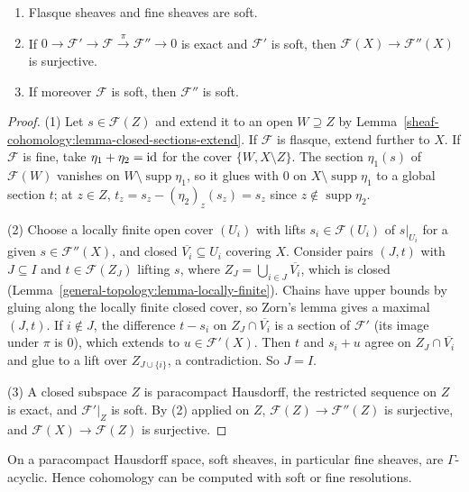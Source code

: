 \begin{lemma}\label{sheaf-cohomology:lemma-soft-properties}
\begin{enumerate}
\item Flasque sheaves and fine sheaves are soft.
\item If $0 \to \mathcal{F}' \to \mathcal{F} \xrightarrow{\pi} \mathcal{F}'' \to 0$ is exact and $\mathcal{F}'$ is soft, then $\mathcal{F}(X) \to \mathcal{F}''(X)$ is surjective.
\item If moreover $\mathcal{F}$ is soft, then $\mathcal{F}''$ is soft.
\end{enumerate}
\end{lemma}

\begin{proof}
(1) Let $s \in \mathcal{F}(Z)$ and extend it to an open $W \supseteq Z$ by Lemma~\ref{sheaf-cohomology:lemma-closed-sections-extend}. If $\mathcal{F}$ is flasque, extend further to $X$. If
$\mathcal{F}$ is fine, take $\eta_1 + \eta_2 = \mathrm{id}$ for the cover $\{W, X \setminus Z\}$. The section $\eta_1(s)$ of $\mathcal{F}(W)$ vanishes on $W \setminus \operatorname{supp}\eta_1$, so it glues
with $0$ on $X \setminus \operatorname{supp}\eta_1$ to a global section $t$; at $z \in Z$, $t_z = s_z - (\eta_2)_z(s_z) = s_z$ since $z \notin \operatorname{supp}\eta_2$.

(2) Choose a locally finite open cover $(U_i)$ with lifts $s_i \in \mathcal{F}(U_i)$ of $s|_{U_i}$ for a given $s \in \mathcal{F}''(X)$, and closed $\overline{V_i} \subseteq U_i$ covering $X$. Consider pairs
$(J, t)$ with $J \subseteq I$ and $t \in \mathcal{F}(Z_J)$ lifting $s$, where $Z_J = \bigcup_{i \in J}\overline{V_i}$, which is closed (Lemma~\ref{general-topology:lemma-locally-finite}). Chains
have upper bounds by gluing along the locally finite closed cover, so Zorn's lemma gives a maximal $(J, t)$. If $i \notin J$, the difference $t - s_i$ on $Z_J \cap \overline{V_i}$ is a section of
$\mathcal{F}'$ (its image under $\pi$ is $0$), which extends to $u \in \mathcal{F}'(X)$. Then $t$ and $s_i + u$ agree on $Z_J \cap \overline{V_i}$ and glue to a lift over $Z_{J \cup \{i\}}$, a
contradiction. So $J = I$.

(3) A closed subspace $Z$ is paracompact Hausdorff, the restricted sequence on $Z$ is exact, and $\mathcal{F}'|_Z$ is soft. By (2) applied on $Z$, $\mathcal{F}(Z) \to \mathcal{F}''(Z)$ is surjective,
and $\mathcal{F}(X) \to \mathcal{F}(Z)$ is surjective.
\end{proof}

\begin{theorem}\label{sheaf-cohomology:theorem-soft-acyclic}
On a paracompact Hausdorff space, soft sheaves, in particular fine sheaves, are $\Gamma$-acyclic. Hence cohomology can be computed with soft or fine resolutions.
\end{theorem}

